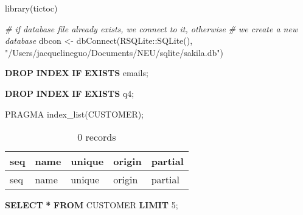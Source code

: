 \documentclass[
]{article}
\newenvironment{Shaded}{\begin{snugshade}}{\end{snugshade}}
\newcommand{\CommentTok}[1]{\textcolor[rgb]{0.56,0.35,0.01}{\textit{#1}}}
\newcommand{\ControlFlowTok}[1]{\textcolor[rgb]{0.13,0.29,0.53}{\textbf{#1}}}
\newcommand{\DecValTok}[1]{\textcolor[rgb]{0.00,0.00,0.81}{#1}}
\newcommand{\FunctionTok}[1]{\textcolor[rgb]{0.00,0.00,0.00}{#1}}
\newcommand{\KeywordTok}[1]{\textcolor[rgb]{0.13,0.29,0.53}{\textbf{#1}}}
\newcommand{\NormalTok}[1]{#1}
\newcommand{\OperatorTok}[1]{\textcolor[rgb]{0.81,0.36,0.00}{\textbf{#1}}}
\newcommand{\OtherTok}[1]{\textcolor[rgb]{0.56,0.35,0.01}{#1}}
\newcommand{\SpecialCharTok}[1]{\textcolor[rgb]{0.00,0.00,0.00}{#1}}
\newcommand{\StringTok}[1]{\textcolor[rgb]{0.31,0.60,0.02}{#1}}
\begin{document}
\begin{Shaded}
\begin{Highlighting}[]
\FunctionTok{library}\NormalTok{(tictoc)}

\CommentTok{\# if database file already exists, we connect to it, otherwise}
\CommentTok{\# we create a new database}
\NormalTok{dbcon }\OtherTok{\textless{}{-}} \FunctionTok{dbConnect}\NormalTok{(RSQLite}\SpecialCharTok{::}\FunctionTok{SQLite}\NormalTok{(), }\StringTok{"/Users/jacquelineguo/Documents/NEU/sqlite/sakila.db"}\NormalTok{)}
\end{Highlighting}
\end{Shaded}

\begin{Shaded}
\begin{Highlighting}[]
\KeywordTok{DROP} \KeywordTok{INDEX} \ControlFlowTok{IF} \KeywordTok{EXISTS}\NormalTok{ emails;}
\end{Highlighting}
\end{Shaded}

\begin{Shaded}
\begin{Highlighting}[]
\KeywordTok{DROP} \KeywordTok{INDEX} \ControlFlowTok{IF} \KeywordTok{EXISTS}\NormalTok{ q4;}
\end{Highlighting}
\end{Shaded}

\begin{Shaded}
\begin{Highlighting}[]
\NormalTok{PRAGMA index\_list(}\StringTok{\textquotesingle{}CUSTOMER\textquotesingle{}}\NormalTok{);}
\end{Highlighting}
\end{Shaded}

\begin{longtable}[]{@{}lllll@{}}
\caption{0 records}\tabularnewline
\toprule
seq & name & unique & origin & partial \\
\midrule
\endfirsthead
\toprule
seq & name & unique & origin & partial \\
\midrule
\endhead
\bottomrule
\end{longtable}

\begin{Shaded}
\begin{Highlighting}[]
\KeywordTok{SELECT} \OperatorTok{*} \KeywordTok{FROM}\NormalTok{ CUSTOMER }\KeywordTok{LIMIT} \DecValTok{5}\NormalTok{;}
\end{Highlighting}
\end{Shaded}
\end{document}
